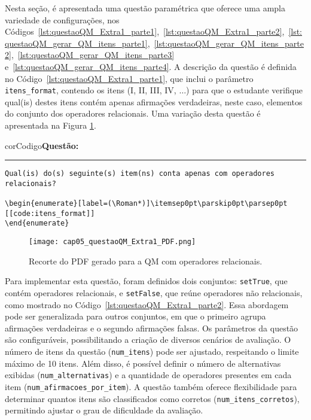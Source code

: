 Nesta seção, é apresentada uma questão paramétrica que oferece uma ampla variedade de configurações, nos Códigos~\ref{lst:questaoQM_Extra1_parte1},~\ref{lst:questaoQM_Extra1_parte2},~\ref{lst:questaoQM_gerar_QM_itens_parte1},~\ref{lst:questaoQM_gerar_QM_itens_parte2},~\ref{lst:questaoQM_gerar_QM_itens_parte3} e~\ref{lst:questaoQM_gerar_QM_itens_parte4}.
%
A descrição da questão é definida no Código~\ref{lst:questaoQM_Extra1_parte1}, que inclui o parâmetro \verb|itens_format|, contendo os itens (I, II, III, IV, \(\ldots\)) para que o estudante verifique qual(is) destes itens contém apenas afirmações verdadeiras, neste caso, elementos do conjunto dos operadores relacionais. Uma variação desta questão é apresentada na Figura \ref{fig:questaoQM_Extra1_PDF}.

\begin{listing}[!ht]
    \begin{myboxCode}{corCodigo}{\textbf{Questão: }}\vspace{3mm}
    \hrule
    \begin{verbatim}
Qual(is) do(s) seguinte(s) item(ns) conta apenas com operadores relacionais?

\begin{enumerate}[label=(\Roman*)]\itemsep0pt\parskip0pt\parsep0pt
[[code:itens_format]]
\end{enumerate}
\end{verbatim}
\end{myboxCode}
\caption{Exemplo de QM paramétrica de operadores relacionais -- Parte 1: Descrição de questão.}
\label{lst:questaoQM_Extra1_parte1}
\end{listing}

\begin{figure}[!ht]
    \texttt{[image: cap05\_questaoQM\_Extra1\_PDF.png]}
    \caption{Recorte do PDF gerado para a QM com operadores relacionais.}
    \label{fig:questaoQM_Extra1_PDF}
\end{figure}

Para implementar esta questão, foram definidos dois conjuntos: \verb|setTrue|, que contém operadores relacionais, e \verb|setFalse|, que reúne operadores não relacionais, como mostrado no Código~\ref{lst:questaoQM_Extra1_parte2}. Essa abordagem pode ser generalizada para outros conjuntos, em que o primeiro agrupa afirmações verdadeiras e o segundo afirmações falsas. Os parâmetros da questão são configuráveis, possibilitando a criação de diversos cenários de avaliação. O número de itens da questão (\verb|num_itens|) pode ser ajustado, respeitando o limite máximo de 10 itens. Além disso, é possível definir o número de alternativas exibidas (\verb|num_alternativas|) e a quantidade de operadores presentes em cada item (\verb|num_afirmacoes_por_item|). A questão também oferece flexibilidade para determinar quantos itens são classificados como corretos (\verb|num_itens_corretos|), permitindo ajustar o grau de dificuldade da avaliação.

